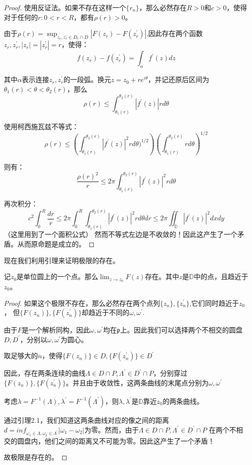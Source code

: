 \documentclass[UTF8]{ctexart}[a4paper,10pt]
\def\D{\mathbb{D}}
\begin{document}
    \begin{proof}
        使用反证法。如果不存在这样一个$\{r_n\}$，那么必然存在$R>0$和$c>0$，使得对于任何的$r:0<r<R$，都有$\rho(r)>0$。

        由于$\rho(r)\displaystyle=\sup_{z_r,z_r^{'}\in D_r\cap D }|F(z_r)-F(z_r^{'})|$,因此存在两个函数$z_r,z_r^{'},|z_r|=|z_r^{'}|=r$，使得：
        $$
        f(z_r)-f(z_r^{'})=\int_{\alpha} f^{'}(z)dz 
        $$
        
        其中$\alpha$表示连接$z_r,z_r^{'}$的一段弧。换元$z=z_0+re^{i\theta}$，并记还原后区间为$\theta_1(r)<\theta<\theta_2(r)$，那么
        $$
        \rho(r)\leq \int_{\theta_1(r)}^{\theta_2(r)}|f^{'}(z)|rd\theta
        $$
        
        使用柯西施瓦兹不等式：
        $$
        \rho(r)\leq \left(\int_{\theta_1(r)}^{\theta_2(r)}|f^{'}(z)|^2rd\theta)^{1/2}\right)\left(\int_{\theta_1(r)}^{\theta_2(r)}rd\theta\right)^{1/2}
        $$
        
        则有：
        $$
        \frac{\rho(r)^2}{r}\leq 2\pi \int_{\theta_1(r)}^{\theta_2(r)}|f^{'}(z)|^2rd\theta
        $$

        再次积分：
        $$
        c^2 \int_0^R \frac{dr}{r} \leq 2\pi \int_0^R \int_{\theta_1(r)}^{\theta_2(r)}|f^{'}(z)|^2rd \theta dr \leq 2\pi \iint_{\D}|f^{'}(z)|^2dxdy
        $$
        （这里用到了一个面积公式）
        然而不等式左边是不收敛的！因此这产生了一个矛盾。从而原命题是成立的。
    \end{proof}
       现在我们利用引理来证明极限的存在。
    \begin{thm}
       记$z_0$是单位圆上的一个点。那么$\lim_{z \to z_0}F(z)$存在。其中$z$是$\D$中的点，且趋近于$z_0$。
    \end{thm}
    \begin{proof}
        如果这个极限不存在，那么必然存在两个点列$\{z_n\},\{z_n^{'}\}$,它们同时趋近于$z_0$，
        但$\{F(z_n)\},\{F(z_n^{'})\}$却趋近于不同的$\omega,\omega^{'}$.

        由于$F$是一个解析同构，因此$\omega,\omega^{'}$均在$\mathfrak{p}$上。因此我们可以选择两个不相交的圆盘$D,D^{'}$，分别以$\omega,\omega^{'}$为圆心。

        取足够大的$n$，使得$\{F(z_n)\}\in D ,\{F(z_n^{'})\} \in D^{'}$

        因此，存在两条连续的曲线$\Lambda \in D \cap P ,\Lambda^{'}\in D^{'} \cap P$，分别穿过$\{F(z_n)\},\{F(z_n^{'})\}$。并且由于收敛性，这两条曲线的末尾点分别为$\omega,\omega^{'}$

        考虑$\lambda=F^{-1}(\Lambda),\lambda^{'}=F^{-1}(\Lambda^{'})$，则$\lambda,\lambda^{'}$是$\D$靠近$z_0$的两条曲线。

        通过引理2.1，我们知道这两条曲线对应的像之间的距离$d=inf_{\omega_1\in \Lambda,\omega_2\in \Lambda^{'}}|\omega_1-\omega_2|$为零。然而，由于$\Lambda \in D \cap P ,\Lambda^{'}\in D^{'} \cap P$
        在两个不相交的圆盘内，他们之间的距离又不可能为零。因此这产生了一个矛盾！

        故极限是存在的。
    \end{proof}
\end{document}
